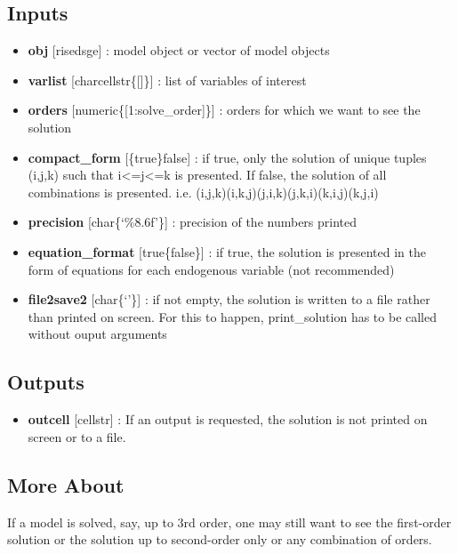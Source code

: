\documentclass[letterpaper,10pt,english]{sphinxmanual}
\begin{document}
\subsection{Inputs}
\label{classes/models/@dsge/dsge:id150}\begin{itemize}
\item {} 
\textbf{obj} {[}rise\textbar{}dsge{]} : model object or vector of model objects

\item {} 
\textbf{varlist} {[}char\textbar{}cellstr\textbar{}\{{[}{]}\}{]} : list of variables of interest

\item {} 
\textbf{orders} {[}numeric\textbar{}\{{[}1:solve\_order{]}\}{]} : orders for which we want to
see the solution

\item {} 
\textbf{compact\_form} {[}\{true\}\textbar{}false{]} : if true, only the solution of unique
tuples (i,j,k) such that i\textless{}=j\textless{}=k is presented. If false, the solution
of all combinations is presented. i.e.
(i,j,k)(i,k,j)(j,i,k)(j,k,i)(k,i,j)(k,j,i)

\item {} 
\textbf{precision} {[}char\textbar{}\{`\%8.6f'\}{]} : precision of the numbers printed

\item {} 
\textbf{equation\_format} {[}true\textbar{}\{false\}{]} : if true, the solution is presented
in the form of equations for each endogenous variable (not recommended)

\item {} 
\textbf{file2save2} {[}char\textbar{}\{`'\}{]} : if not empty, the solution is written to a
file rather than printed on screen. For this to happen, print\_solution
has to be called without ouput arguments

\end{itemize}


\subsection{Outputs}
\label{classes/models/@dsge/dsge:id151}\begin{itemize}
\item {} 
\textbf{outcell} {[}cellstr{]} : If an output is requested, the solution is not
printed on screen or to a file.

\end{itemize}


\subsection{More About}
\label{classes/models/@dsge/dsge:id152}
If a model is solved, say, up to 3rd order, one may still want to see the
first-order solution or the solution up to second-order only or any
combination of orders.
\end{document}
